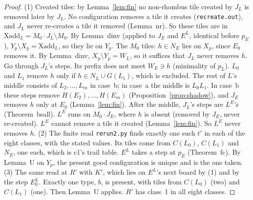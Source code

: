 \documentclass[11pt]{article}
\theoremstyle{definition}\newtheorem{definition}[theorem]{Definition}\newtheorem{remark}[theorem]{Remark}
\begin{document}
\begin{proof}
(1) Created tiles: by Lemma~\ref{lem:fin} no non-rhombus tile created by $J_L$ is removed later by $J_L$. No configuration removes a tile it creates (\texttt{recreate.out}), and $J_L$ never re-creates a tile it removed (Lemma~nr). So these tiles are in $\mathrm{Xadd}_L=M_0\cdot J_L\setminus M_0$. By Lemma~dinv (applied to $J_E$ and $E^L$, identical before $p_E$), $Y_p\setminus X_p=\mathrm{Xadd}_L$, so they lie on $Y_p$.
The $M_0$ tiles: $h\in N_E$ lies on $X_p$, since $E_0$ removes it. By Lemma~dinv, $X_p\setminus Y_p=W_L$, so it suffices that $J_L$ never removes $h$. Go through $J_L$'s steps. Its prefix does not meet $W_E\ni h$ (minimality of $p_L$). $L_0$ and $L_1$ remove $h$ only if $h\in N_L\cup G(L_1)$, which is excluded. The rest of $L$'s middle consists of $L_2,\dots,L_m$ in case~b; in case~a the middle is $L_0L_1$. In case~b these steps remove $H(E_2),\dots,H(E_m)$ (Proposition~\ref{prop:shadow}), and $J_E$ removes $h$ only at $E_0$ (Lemma~\ref{lem:fin}). After the middle, $J_L$'s steps are $L^E$'s (Theorem~bsall). $L^E$ runs on $M_0\cdot J_E$, where $h$ is absent (removed by $J_E$, never re-created). $L^E$ cannot remove a tile it created (Lemma~\ref{lem:fin}). So $L^E$ never removes $h$.
(2) The finite read \texttt{rerun2.py} finds exactly one such $t'$ in each of the eight classes, with the stated values. Its tiles come from $C(L_0)$, $C(L_1)$ and $N_E$, one each, which is c1's trail table. $E^L$ takes a step at $p_E$ (Theorem~fc). By Lemma~U on $Y_p$, the present good configuration is unique and is the one taken.
(3) The same read at $R'$ with $K'$, which lies on $E^L$'s next board by (1) and by the step $E^L_0$. Exactly one type, $b$, is present, with tiles from $C(L_0)$ (two) and $C(L_1)$ (one). Then Lemma~U applies. $R'$ has class~1 in all eight classes.
\end{proof}
\end{document}
